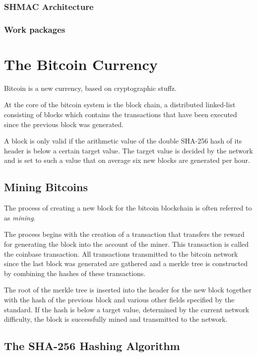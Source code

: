 \subsubsection{SHMAC Architecture}

\subsubsection{Work packages}


\section{The Bitcoin Currency}
\label{sec:bitcoins}

Bitcoin is a new currency, based on cryptographic stuffz.

At the core of the bitcoin system is the block chain, a distributed linked-list consisting of blocks
which contains the transactions that have been executed since the previous block was generated.

A block is only valid if the arithmetic value of the double SHA-256 hash of its header is below
a certain target value. The target value is decided by the network and is set to such a value that
on average six new blocks are generated per hour. \cite{bitcoin}

\subsection{Mining Bitcoins}
\label{sec:bitcoin-mining}

The process of creating a new block for the bitcoin blockchain is often referred to as \textit{mining}.

The process begins with the creation of a transaction that transfers the reward for generating the block
into the account of the miner. This transaction is called the coinbase transaction. All transactions
transmitted to the bitcoin network since the last block was generated are gathered and a merkle tree
is constructed by combining the hashes of these transactions.

The root of the merkle tree is inserted into the header for the new block together with the hash of the
previous block and various other fields specified by the standard. If the hash is below a target value,
determined by the current network difficulty, the block is successfully mined and transmitted to the
network.

\subsection{The SHA-256 Hashing Algorithm}
\label{sec:hashing-algo}

